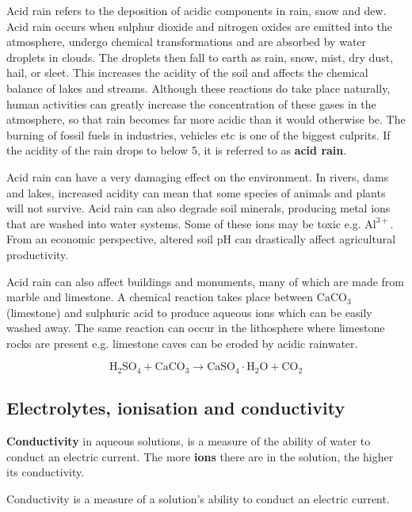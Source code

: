 \begin{enumerate}[noitemsep, label=\textbf{\arabic*}. ]
\label{m38720*fhsst!!!underscore!!!id5341}
 { \label{m38720*meaningfhsst!!!underscore!!!id5341}
       Acid rain refers to the deposition of acidic components in rain, snow and dew. Acid rain occurs when sulphur dioxide and nitrogen oxides are emitted into the atmosphere, undergo chemical transformations and are absorbed by water droplets in clouds. The droplets then fall to earth as rain, snow, mist, dry dust, hail, or sleet. This increases the acidity of the soil and affects the chemical balance of lakes and streams. 
         } 
\label{m38720*id338300}Although these reactions do take place naturally, human activities can greatly increase the concentration of these gases in the atmosphere, so that rain becomes far more acidic than it would otherwise be. The burning of fossil fuels in industries, vehicles etc is one of the biggest culprits. If the acidity of the rain drops to below 5, it is referred to as \textbf{acid rain}.\par 
        \label{m38720*id338311}Acid rain can have a very damaging effect on the environment. In rivers, dams and lakes, increased acidity can mean that some species of animals and plants will not survive. Acid rain can also degrade soil minerals, producing metal ions that are washed into water systems. Some of these ions may be toxic e.g. ${\mathrm{Al}}^{3+}$. From an economic perspective, altered soil pH can drastically affect agricultural productivity.\par 
        \label{m38720*id338337}Acid rain can also affect buildings and monuments, many of which are made from marble and limestone. A chemical reaction takes place between ${\mathrm{CaCO}}_{3}$ (limestone) and sulphuric acid to produce aqueous ions which can be easily washed away. The same reaction can occur in the lithosphere where limestone rocks are present e.g. limestone caves can be eroded by acidic rainwater.
        \label{m38720*id7435}\nopagebreak\noindent{}
        
    \begin{equation}
    {\mathrm{H}}_{2}{\mathrm{SO}}_{4}+{\mathrm{CaCO}}_{3}\to {\mathrm{CaSO}}_{4}\ensuremath{\cdot}\mathrm{H}{}_{2}\mathrm{O}+{\mathrm{CO}}_{2}\tag{17.2}
      \end{equation}
\par 
\end{enumerate}
    \label{m38720*cid7}
            \subsection{ Electrolytes, ionisation and conductivity}
            \nopagebreak
      \label{m38720*id338608}\textbf{Conductivity} in aqueous solutions, is a measure of the ability of water to conduct an electric current. The more \textbf{ions} there are in the solution, the higher its conductivity.\par 
\label{m38720*fhsst!!!underscore!!!id635}
 { \label{m38720*meaningfhsst!!!underscore!!!id635}
      Conductivity is a measure of a solution's ability to conduct an electric current.
       } 
      \label{m38720*uid52}
